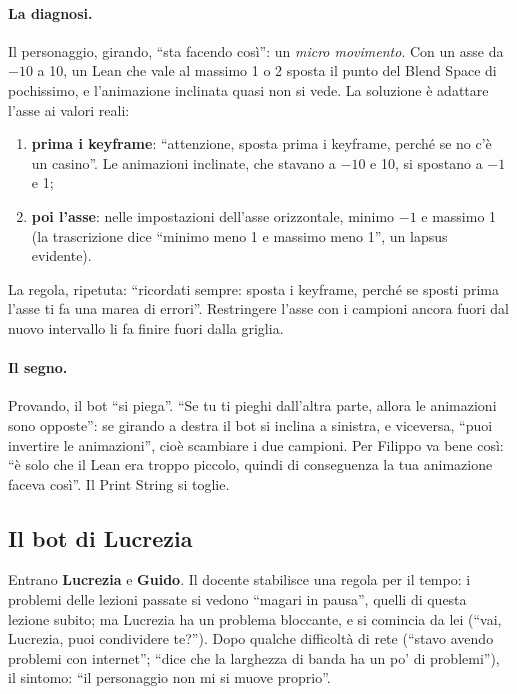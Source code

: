 \paragraph{La diagnosi.} Il personaggio, girando, ``sta facendo così'': un
\emph{micro movimento}. Con un asse da $-10$ a 10, un Lean che vale al massimo 1 o 2
sposta il punto del Blend Space di pochissimo, e l'animazione inclinata quasi non si vede.
La soluzione è adattare l'asse ai valori reali:
\begin{enumerate}
  \item \textbf{prima i keyframe}: ``attenzione, sposta prima i keyframe, perché se no c'è
        un casino''. Le animazioni inclinate, che stavano a $-10$ e 10, si spostano a
        $-1$ e 1;
  \item \textbf{poi l'asse}: nelle impostazioni dell'asse orizzontale, minimo $-1$ e
        massimo 1 (la trascrizione dice ``minimo meno 1 e massimo meno 1'', un lapsus
        evidente).
\end{enumerate}
La regola, ripetuta: ``ricordati sempre: sposta i keyframe, perché se sposti prima
l'asse ti fa una marea di errori''. Restringere l'asse con i campioni ancora fuori dal
nuovo intervallo li fa finire fuori dalla griglia.

\paragraph{Il segno.} Provando, il bot ``si piega''. ``Se tu ti pieghi dall'altra parte,
allora le animazioni sono opposte'': se girando a destra il bot si inclina a sinistra, e
viceversa, ``puoi invertire le animazioni'', cioè scambiare i due campioni. Per Filippo va
bene così: ``è solo che il Lean era troppo piccolo, quindi di conseguenza la tua animazione
faceva così''. Il Print String si toglie.

\subsection{Il bot di Lucrezia}

Entrano \textbf{Lucrezia} e \textbf{Guido}. Il docente stabilisce una regola per il
tempo: i problemi delle lezioni passate si vedono ``magari in pausa'', quelli di questa
lezione subito; ma Lucrezia ha un problema bloccante, e si comincia da lei (``vai,
Lucrezia, puoi condividere te?''). Dopo qualche difficoltà di rete (``stavo avendo
problemi con internet''; ``dice che la larghezza di banda ha un po' di problemi''), il
sintomo: ``il personaggio non mi si muove proprio''.


